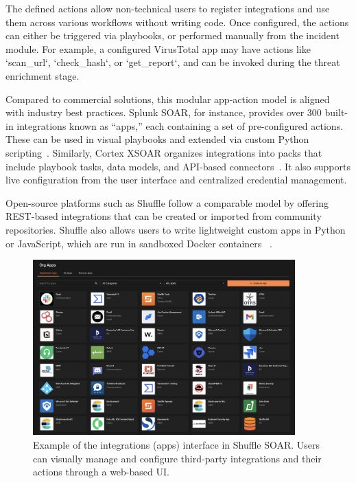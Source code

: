 The defined actions allow non-technical users to register integrations and use them across various workflows without writing code. Once configured, the actions can either be triggered via playbooks, or performed manually from the incident module. For example, a configured VirusTotal app may have actions like ‘scan\_url‘, ‘check\_hash‘, or ‘get\_report‘, and can be invoked during the threat enrichment stage.

Compared to commercial solutions, this modular app-action model is aligned with industry best practices. Splunk SOAR, for instance, provides over 300 built-in integrations known as “apps,” each containing a set of pre-configured actions. These can be used in visual playbooks and extended via custom Python scripting~\cite{splunk}. Similarly, Cortex XSOAR organizes integrations into packs that include playbook tasks, data models, and API-based connectors~\cite{paloalto}. It also supports live configuration from the user interface and centralized credential management.

Open-source platforms such as Shuffle follow a comparable model by offering REST-based integrations that can be created or imported from community repositories. Shuffle also allows users to write lightweight custom apps in Python or JavaScript, which are run in sandboxed Docker containers ~\cite{techtarget}.

\begin{figure}[ht]
    \centering
    \includegraphics[width=0.9\textwidth]{images/shuffle_soar_apps.png}
    \caption[Example of the integrations (apps) interface in Shuffle SOAR]{Example of the integrations (apps) interface in Shuffle SOAR. Users can visually manage and configure third-party integrations and their actions through a web-based UI.}
    \label{fig:shuffle-soar-apps}
\end{figure}

